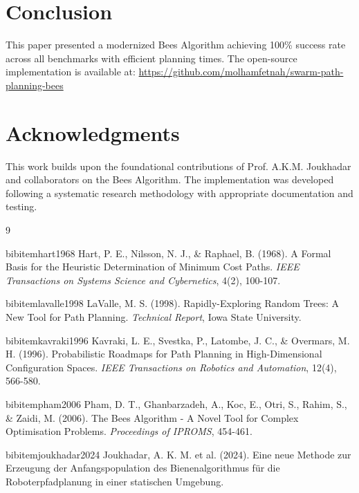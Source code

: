 \documentclass[10pt,a4paper]{article}
\begin{document}
\section{Conclusion}
This paper presented a modernized Bees Algorithm achieving 100\% success rate across all benchmarks with efficient planning times. The open-source implementation is available at: \url{https://github.com/molhamfetnah/swarm-path-planning-bees}

\section*{Acknowledgments}
This work builds upon the foundational contributions of Prof. A.K.M. Joukhadar and collaborators on the Bees Algorithm. The implementation was developed following a systematic research methodology with appropriate documentation and testing.

\begin{thebibliography}{9}

 bibitem{hart1968} Hart, P. E., Nilsson, N. J., \& Raphael, B. (1968). A Formal Basis for the Heuristic Determination of Minimum Cost Paths. \textit{IEEE Transactions on Systems Science and Cybernetics}, 4(2), 100-107.

 bibitem{lavalle1998} LaValle, M. S. (1998). Rapidly-Exploring Random Trees: A New Tool for Path Planning. \textit{Technical Report}, Iowa State University.

 bibitem{kavraki1996} Kavraki, L. E., Svestka, P., Latombe, J. C., \& Overmars, M. H. (1996). Probabilistic Roadmaps for Path Planning in High-Dimensional Configuration Spaces. \textit{IEEE Transactions on Robotics and Automation}, 12(4), 566-580.

 bibitem{pham2006} Pham, D. T., Ghanbarzadeh, A., Koc, E., Otri, S., Rahim, S., \& Zaidi, M. (2006). The Bees Algorithm - A Novel Tool for Complex Optimisation Problems. \textit{Proceedings of IPROMS}, 454-461.

 bibitem{joukhadar2024} Joukhadar, A. K. M. et al. (2024). Eine neue Methode zur Erzeugung der Anfangspopulation des Bienenalgorithmus für die Roboterpfadplanung in einer statischen Umgebung.

\end{thebibliography}
\end{document}
